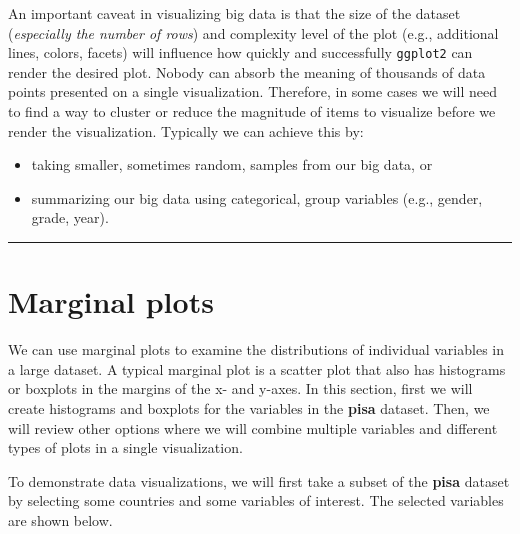 \documentclass[
]{book}
\providecommand{\tightlist}{%
  \setlength{\itemsep}{0pt}\setlength{\parskip}{0pt}}
\begin{document}
An important caveat in visualizing big data is that the size of the dataset (\emph{especially the number of rows}) and complexity level of the plot (e.g., additional lines, colors, facets) will influence how quickly and successfully \texttt{ggplot2} can render the desired plot. Nobody can absorb the meaning of thousands of data points presented on a single visualization. Therefore, in some cases we will need to find a way to cluster or reduce the magnitude of items to visualize before we render the visualization. Typically we can achieve this by:

\begin{itemize}
\tightlist
\item
  taking smaller, sometimes random, samples from our big data, or
\item
  summarizing our big data using categorical, group variables (e.g., gender, grade, year).
\end{itemize}

\begin{center}\rule{0.5\linewidth}{0.5pt}\end{center}

\hypertarget{marginal-plots}{%
\section{Marginal plots}\label{marginal-plots}}

We can use marginal plots to examine the distributions of individual variables in a large dataset. A typical marginal plot is a scatter plot that also has histograms or boxplots in the margins of the x- and y-axes. In this section, first we will create histograms and boxplots for the variables in the \textbf{pisa} dataset. Then, we will review other options where we will combine multiple variables and different types of plots in a single visualization.

To demonstrate data visualizations, we will first take a subset of the \textbf{pisa} dataset by selecting some countries and some variables of interest. The selected variables are shown below.
\end{document}
